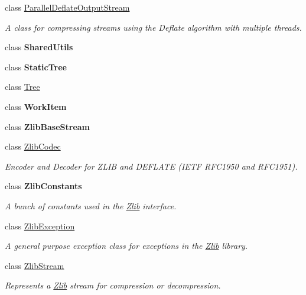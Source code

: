 \begin{DoxyCompactItemize}
\item 
class \mbox{\hyperlink{class_super_tiled2_unity_1_1_ionic_1_1_zlib_1_1_parallel_deflate_output_stream}{Parallel\+Deflate\+Output\+Stream}}
\begin{DoxyCompactList}\small\item\em A class for compressing streams using the Deflate algorithm with multiple threads. \end{DoxyCompactList}\item 
class {\bfseries Shared\+Utils}
\item 
class {\bfseries Static\+Tree}
\item 
class \mbox{\hyperlink{class_super_tiled2_unity_1_1_ionic_1_1_zlib_1_1_tree}{Tree}}
\item 
class {\bfseries Work\+Item}
\item 
class {\bfseries Zlib\+Base\+Stream}
\item 
class \mbox{\hyperlink{class_super_tiled2_unity_1_1_ionic_1_1_zlib_1_1_zlib_codec}{Zlib\+Codec}}
\begin{DoxyCompactList}\small\item\em Encoder and Decoder for Z\+L\+IB and D\+E\+F\+L\+A\+TE (I\+E\+TF R\+F\+C1950 and R\+F\+C1951). \end{DoxyCompactList}\item 
class {\bfseries Zlib\+Constants}
\begin{DoxyCompactList}\small\item\em A bunch of constants used in the \mbox{\hyperlink{namespace_super_tiled2_unity_1_1_ionic_1_1_zlib}{Zlib}} interface. \end{DoxyCompactList}\item 
class \mbox{\hyperlink{class_super_tiled2_unity_1_1_ionic_1_1_zlib_1_1_zlib_exception}{Zlib\+Exception}}
\begin{DoxyCompactList}\small\item\em A general purpose exception class for exceptions in the \mbox{\hyperlink{namespace_super_tiled2_unity_1_1_ionic_1_1_zlib}{Zlib}} library. \end{DoxyCompactList}\item 
class \mbox{\hyperlink{class_super_tiled2_unity_1_1_ionic_1_1_zlib_1_1_zlib_stream}{Zlib\+Stream}}
\begin{DoxyCompactList}\small\item\em Represents a \mbox{\hyperlink{namespace_super_tiled2_unity_1_1_ionic_1_1_zlib}{Zlib}} stream for compression or decompression. \end{DoxyCompactList}\end{DoxyCompactItemize}
